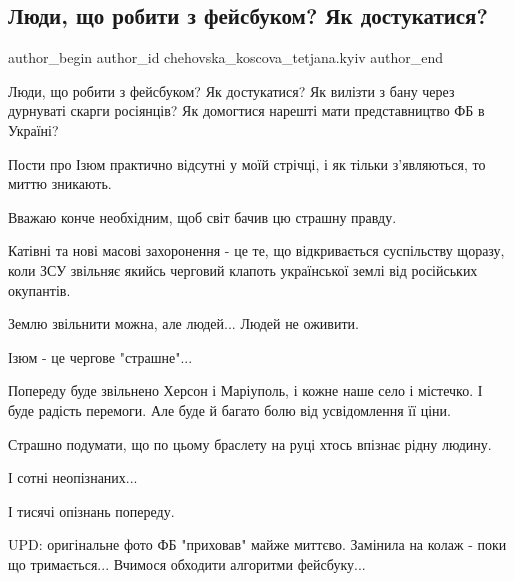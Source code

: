  
 
 
 
 
 
\subsection{Люди, що робити з фейсбуком? Як достукатися?}
\label{sec:17_09_2022.fb.chehovska_koscova_tetjana.kyiv.1.facebook}
 
\ifcmt
 author_begin
   author_id chehovska_koscova_tetjana.kyiv
 author_end
\fi

Люди, що робити з фейсбуком? Як достукатися? Як вилізти з бану через дурнуваті
скарги росіянців? Як домогтися нарешті мати представництво ФБ в Україні?

Пости про Ізюм практично відсутні у моїй стрічці, і як тільки з'являються, то
миттю зникають.

Вважаю конче необхідним, щоб світ бачив цю страшну правду. 

Катівні та нові масові захоронення - це те, що відкривається суспільству
щоразу, коли ЗСУ звільняє якийсь черговий клапоть української землі від
російських окупантів.


Землю звільнити можна, але людей... Людей не оживити.

Ізюм - це чергове "страшне"...

Попереду буде звільнено Херсон і Маріуполь, і кожне наше село і містечко. І
буде радість перемоги. Але буде й багато болю від усвідомлення її ціни.

Страшно подумати, що по цьому браслету на руці хтось впізнає рідну людину.

І сотні неопізнаних...

І тисячі опізнань попереду.

UPD: оригінальне фото ФБ "приховав" майже миттєво. Замінила на колаж - поки що
тримається... Вчимося обходити алгоритми фейсбуку...


